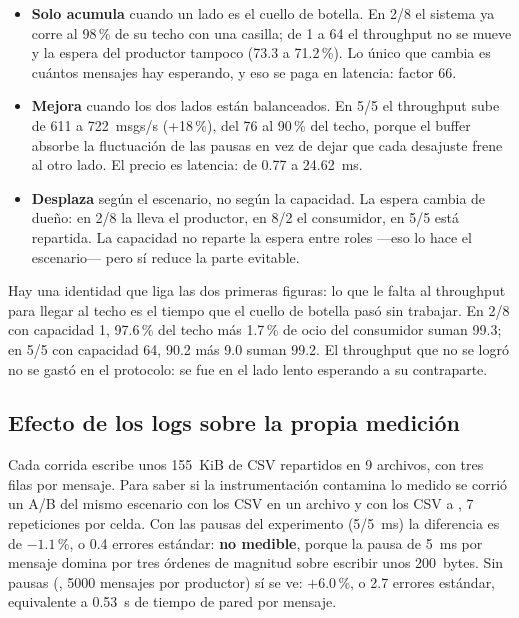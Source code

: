 \begin{itemize}
\item \textbf{Solo acumula} cuando un lado es el cuello de botella. En 2/8
      el sistema ya corre al 98\,\% de su techo con una casilla; de 1 a 64
      el throughput no se mueve y la espera del productor tampoco
      (73.3 a 71.2\,\%). Lo único que cambia es cuántos mensajes hay
      esperando, y eso se paga en latencia: factor 66.
\item \textbf{Mejora} cuando los dos lados están balanceados. En 5/5 el
      throughput sube de 611 a 722~msgs/s (+18\,\%), del 76 al 90\,\% del
      techo, porque el buffer absorbe la fluctuación de las pausas en vez de
      dejar que cada desajuste frene al otro lado. El precio es latencia:
      de 0.77 a 24.62~ms.
\item \textbf{Desplaza} según el escenario, no según la capacidad. La espera
      cambia de dueño: en 2/8 la lleva el productor, en 8/2 el consumidor,
      en 5/5 está repartida. La capacidad no reparte la espera entre roles
      ---eso lo hace el escenario--- pero sí reduce la parte evitable.
\end{itemize}

Hay una identidad que liga las dos primeras figuras: lo que le falta al
throughput para llegar al techo es el tiempo que el cuello de botella pasó
sin trabajar. En 2/8 con capacidad 1, 97.6\,\% del techo más 1.7\,\% de ocio
del consumidor suman 99.3; en 5/5 con capacidad 64, 90.2 más 9.0 suman 99.2.
El throughput que no se logró no se gastó en el protocolo: se fue en el lado
lento esperando a su contraparte.

\subsection{Efecto de los logs sobre la propia medición}

Cada corrida escribe unos 155~KiB de CSV repartidos en 9 archivos, con tres
filas por mensaje. Para saber si la instrumentación contamina lo medido se
corrió un A/B del mismo escenario con los CSV en un archivo y con los CSV a
, 7 repeticiones por celda. Con las pausas del experimento
(5/5~ms) la diferencia es de $-1.1$\,\%, o 0.4 errores estándar:
\textbf{no medible}, porque la pausa de 5~ms por mensaje domina por tres
órdenes de magnitud sobre escribir unos 200~bytes. Sin pausas
(, 5000 mensajes por productor) sí se ve: $+6.0$\,\%, o
2.7 errores estándar, equivalente a 0.53~\textmu s de tiempo de pared por
mensaje.

